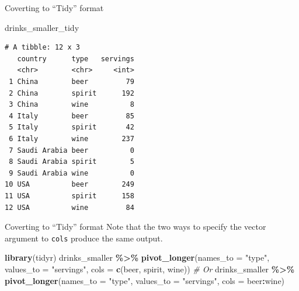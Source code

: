 \documentclass[
  ignorenonframetext,
]{beamer}
\newenvironment{Shaded}{\begin{snugshade}}{\end{snugshade}}
\newcommand{\AttributeTok}[1]{\textcolor[rgb]{0.13,0.29,0.53}{#1}}
\newcommand{\CommentTok}[1]{\textcolor[rgb]{0.56,0.35,0.01}{\textit{#1}}}
\newcommand{\FunctionTok}[1]{\textcolor[rgb]{0.13,0.29,0.53}{\textbf{#1}}}
\newcommand{\NormalTok}[1]{#1}
\newcommand{\SpecialCharTok}[1]{\textcolor[rgb]{0.81,0.36,0.00}{\textbf{#1}}}
\newcommand{\StringTok}[1]{\textcolor[rgb]{0.31,0.60,0.02}{#1}}
\begin{document}
\begin{frame}[fragile]{Coverting to ``Tidy'' format}
\protect\hypertarget{coverting-to-tidy-format-1}{}
\begin{Shaded}
\begin{Highlighting}[]
\NormalTok{drinks\_smaller\_tidy}
\end{Highlighting}
\end{Shaded}

\begin{verbatim}
# A tibble: 12 x 3
   country      type   servings
   <chr>        <chr>     <int>
 1 China        beer         79
 2 China        spirit      192
 3 China        wine          8
 4 Italy        beer         85
 5 Italy        spirit       42
 6 Italy        wine        237
 7 Saudi Arabia beer          0
 8 Saudi Arabia spirit        5
 9 Saudi Arabia wine          0
10 USA          beer        249
11 USA          spirit      158
12 USA          wine         84
\end{verbatim}
\end{frame}

\begin{frame}[fragile]{Coverting to ``Tidy'' format}
\protect\hypertarget{coverting-to-tidy-format-2}{}
Note that the two ways to specify the vector argument to \texttt{cols}
produce the same output.

\normalsize

\begin{Shaded}
\begin{Highlighting}[]
\FunctionTok{library}\NormalTok{(tidyr)}
\NormalTok{drinks\_smaller }\SpecialCharTok{\%\textgreater{}\%} 
  \FunctionTok{pivot\_longer}\NormalTok{(}\AttributeTok{names\_to =} \StringTok{"type"}\NormalTok{, }
               \AttributeTok{values\_to =} \StringTok{"servings"}\NormalTok{, }
               \AttributeTok{cols =} \FunctionTok{c}\NormalTok{(beer, spirit, wine))}
\CommentTok{\# Or}
\NormalTok{drinks\_smaller }\SpecialCharTok{\%\textgreater{}\%} 
  \FunctionTok{pivot\_longer}\NormalTok{(}\AttributeTok{names\_to =} \StringTok{"type"}\NormalTok{, }
               \AttributeTok{values\_to =} \StringTok{"servings"}\NormalTok{, }
               \AttributeTok{cols =}\NormalTok{ beer}\SpecialCharTok{:}\NormalTok{wine)}
\end{Highlighting}
\end{Shaded}

\normalsize
\end{frame}
\end{document}
